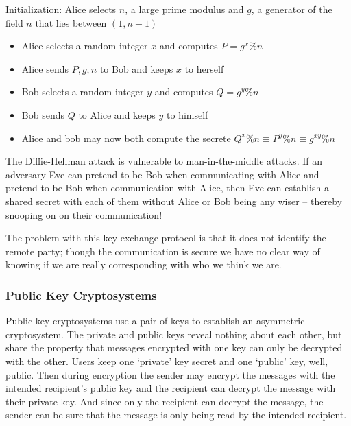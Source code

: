 \documentclass[../notes.tex]{subfiles}
\begin{document}
\begin{definition}
    Initialization: Alice selects $ n $, a large prime modulus and $ g $, a generator of the field $ n $ that lies between $ (1, n-1) $

    \begin{itemize}
        \item Alice selects a random integer $ x $ and computes $ P = g^x \% n $
        \item Alice sends $ P, g, n $ to Bob and keeps $ x $ to herself
        \item Bob selects a random integer $ y $ and computes $ Q = g^y \% n $
        \item Bob sends $ Q $ to Alice and keeps $ y $ to himself
        \item Alice and bob may now both compute the secrete $ Q^x \% n \equiv  P^y \% n \equiv g^{xy} \% n $
    \end{itemize}

\end{definition}

The Diffie-Hellman attack is vulnerable to man-in-the-middle attacks.
If an adversary Eve can pretend to be Bob when communicating with Alice and pretend to be Bob when communication with Alice, then Eve can establish a shared secret with each of them without Alice or Bob being any wiser -- thereby snooping on on their communication!

The problem with this key exchange protocol is that it does not identify the remote party; though the communication is secure we have no clear way of knowing if we are really corresponding with who we think we are.



\subsubsection{Public Key Cryptosystems}
Public key cryptosystems use a pair of keys to establish an asymmetric cryptosystem. The private and public keys reveal nothing about each other, but share the property that messages encrypted with one key can only be decrypted with the other.
Users keep one `private' key secret and one `public' key, well, public. Then during encryption the sender may encrypt the messages with the intended recipient's public key and the recipient can decrypt the message with their private key.
And since only the recipient can decrypt the message, the sender can be sure that the message is only being read by the intended recipient.
\end{document}
